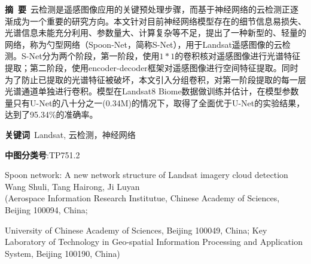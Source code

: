 \documentclass[10pt]{ctexart}
\begin{document}
\setlength{\columnsep}{25pt} 
\date{}


\maketitle
\pagestyle{empty} %
\thispagestyle{empty} %
\noindent\textbf{摘\ 要}\ 云检测是遥感图像应用的关键预处理步骤，而基于神经网络的云检测正逐渐成为一个重要的研究方向。本文针对目前神经网络模型存在的细节信息易损失、光谱信息未能充分利用、参数量大、计算复杂等不足，提出了一种新型的、轻量的网络，称为勺型网络（Spoon-Net，简称S-Net），用于Landsat遥感图像的云检测。S-Net分为两个阶段，第一阶段，使用$1*1$的卷积核对遥感图像进行光谱特征提取；第二阶段，使用encoder-decoder框架对遥感图像进行空间特征提取。同时为了防止已提取的光谱特征被破坏，本文引入分组卷积，对第一阶段提取的每一层光谱通道单独进行卷积。模型在Landsat8 Biome数据做训练并估计，在模型参数量只有U-Net的八十分之一(0.34M)的情况下，取得了全面优于U-Net的实验结果，达到了95.34\%的准确率。

\noindent\textbf{关键词}\ Landsat, 云检测，神经网络

\noindent\textbf{中图分类号}:TP751.2

\begin{center}
    \Large
    Spoon network: A new network structure of Landsat imagery cloud detection
    \\[10pt]
    \normalsize 
    Wang Shuli, Tang Hairong, Ji Luyan
    \\[8pt]
    \small
    (Aerospace Information Research Institutue, Chinese Academy of Sciences, Beijing 100094, China;
    
    University of Chinese Academy of Sciences, Beijing 100049, China; Key Laboratory of Technology in Geo-spatial Information Processing and Application System, Beijing 100190, China)
\end{center}
\end{document}
